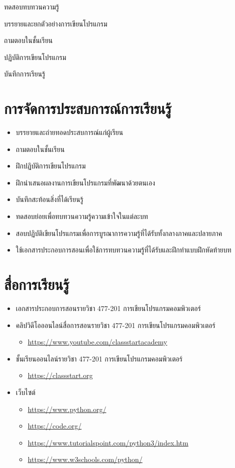 {
\item ทดสอบทบทวนความรู้
\item  บรรยายและยกตัวอย่างการเขียนโปรแกรม
\item  ถามตอบในชั้นเรียน
\item  ปฏิบัติการเขียนโปรแกรม
\item  บันทึกการเรียนรู้
}


\section*{การจัดการประสบการณ์การเรียนรู้}

\begin{itemize}
\item บรรยายและถ่ายทอดประสบการณ์แก่ผู้เรียน
\item ถามตอบในชั้นเรียน
\item ฝึกปฏิบัติการเขียนโปรแกรม
\item  ฝึกนำเสนอผลงานการเขียนโปรแกรมที่พัฒนาด้วยตนเอง
\item  บันทึกสะท้อนสิ่งที่ได้เรียนรู้
\item  ทดสอบย่อยเพื่อทบทวนความรู้ความเข้าใจในแต่ละบท
\item  สอบปฏิบัติเขียนโปรแกรมเพื่อการบูรณาการความรู้ที่ได้รับทั้งกลางภาคและปลายภาค
\item  ใช้เอกสารประกอบการสอนเพื่อใช้การทบทวนความรู้ที่ได้รับและฝึกทำแบบฝึกหัดท้ายบท
\end{itemize}


\section*{สื่อการเรียนรู้}

\begin{itemize}
\item เอกสารประกอบการสอนรายวิชา 477-201 การเขียนโปรแกรมคอมพิวเตอร์
\item คลิปวิดีโอออนไลน์สื่อการสอนรายวิชา 477-201 การเขียนโปรแกรมคอมพิวเตอร์
    \begin{itemize}
    \item \url{https://www.youtube.com/classstartacademy}
    \end{itemize}
\item ชั้นเรียนออนไลน์รายวิชา 477-201 การเขียนโปรแกรมคอมพิวเตอร์
    \begin{itemize}
    \item \url{https://classstart.org}
    \end{itemize}
\item เว็บไซต์
    \begin{itemize}
    \item \url{https://www.python.org/}
    \item \url{https://code.org/}
    \item \url{https://www.tutorialspoint.com/python3/index.htm}
    \item \url{https://www.w3schools.com/python/}
    \end{itemize}
\end{itemize}


